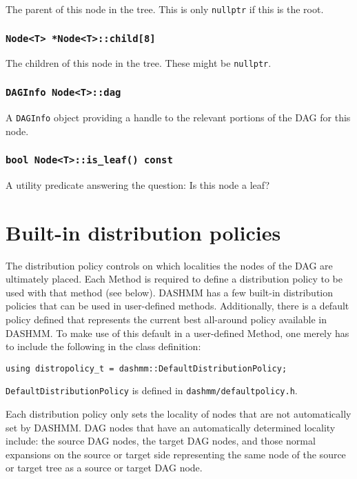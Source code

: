 The parent of this node in the tree. This is only \texttt{nullptr} if this is
the root.

\subsubsection{\texttt{Node<T> *Node<T>::child[8]}}

The children of this node in the tree. These might be \texttt{nullptr}.

\subsubsection{\texttt{DAGInfo Node<T>::dag}}

A \texttt{DAGInfo} object providing a handle to the relevant portions of the
DAG for this node.

\subsubsection{\texttt{bool Node<T>::is\_leaf() const}}

A utility predicate answering the question: Is this node a leaf?


\section{Built-in distribution policies}

The distribution policy controls on which localities the nodes of the DAG
are ultimately placed. Each Method is required to define a distribution policy
to be used with that method (see below). DASHMM has a few built-in distribution
policies that can be used in user-defined methods. Additionally, there is a
default policy defined that represents the current best all-around policy
available in DASHMM. To make use of this default in a user-defined Method,
one merely has to include the following in the class definition:

\begin{verbatim}
using distropolicy_t = dashmm::DefaultDistributionPolicy;
\end{verbatim}

\noindent \texttt{DefaultDistributionPolicy} is defined in
\texttt{dashmm/defaultpolicy.h}.

Each distribution policy only sets the locality of nodes that are not
automatically set by DASHMM. DAG nodes that have an automatically determined
locality include: the source DAG nodes, the target DAG nodes, and those
normal expansions on the source or target side representing the same node of
the source or target tree as a source or target DAG node.


